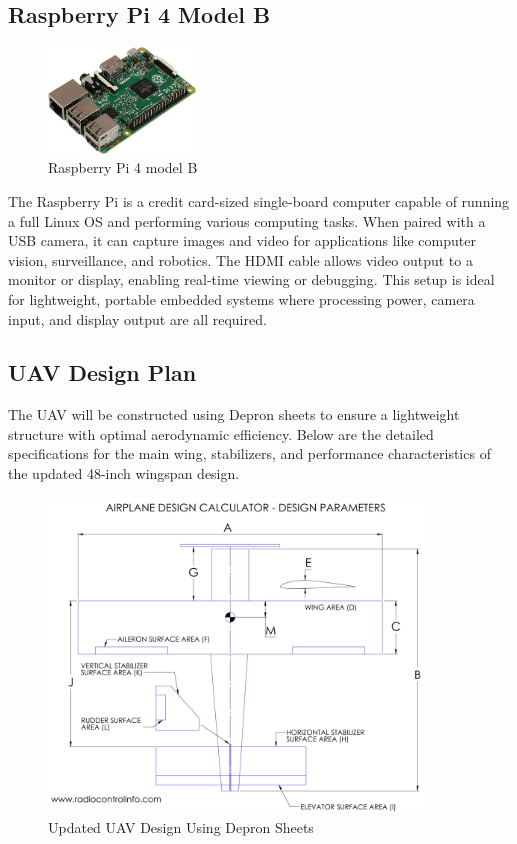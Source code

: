 \subsection{Raspberry Pi 4 Model B}
\begin{figure}[H]
\centering
\includegraphics[width=0.35\textwidth]{images/raspimg.jpg}
\caption{Raspberry Pi 4 model B}
\end{figure}
The Raspberry Pi is a credit card-sized single-board computer capable of running a full Linux OS and performing various computing tasks. When paired with a USB camera, it can capture images and video for applications like computer vision, surveillance, and robotics. The HDMI cable allows video output to a monitor or display, enabling real-time viewing or debugging. This setup is ideal for lightweight, portable embedded systems where processing power, camera input, and display output are all required.

\subsection{UAV Design Plan}

The UAV will be constructed using Depron sheets to ensure a lightweight structure with optimal aerodynamic efficiency. Below are the detailed specifications for the main wing, stabilizers, and performance characteristics of the updated 48-inch wingspan design.

\begin{figure}[H]
    \centering
    \includegraphics[width=0.9\textwidth]{images/uav_design_img.png} %
    \caption{Updated UAV Design Using Depron Sheets}
    \label{fig:uav_design}
\end{figure}

